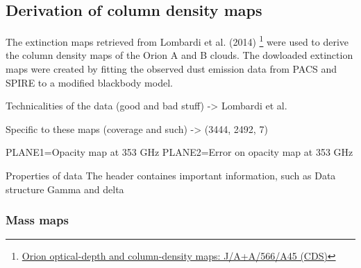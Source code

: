 \subsection{Derivation of column density maps}

The extinction maps retrieved from Lombardi et al. (2014) \footnote{\href{https://cdsarc.cds.unistra.fr/viz-bin/cat/J/A+A/566/A45\#/browse}{Orion optical-depth and column-density maps: J/A+A/566/A45 (CDS)}} were used to derive the column density maps of the Orion A and B clouds. The dowloaded extinction maps were created by fitting the observed dust emission data from PACS and SPIRE to a modified blackbody model.

Technicalities of the data (good and bad stuff) -> Lombardi et al.

Specific to these maps (coverage and such) -> (3444, 2492, 7)

PLANE1=Opacity map at 353 GHz
PLANE2=Error on opacity map at 353 GHz

Properties of data
The header containes important information, such as 
Data structure
Gamma and delta 











\subsubsection{Mass maps}

